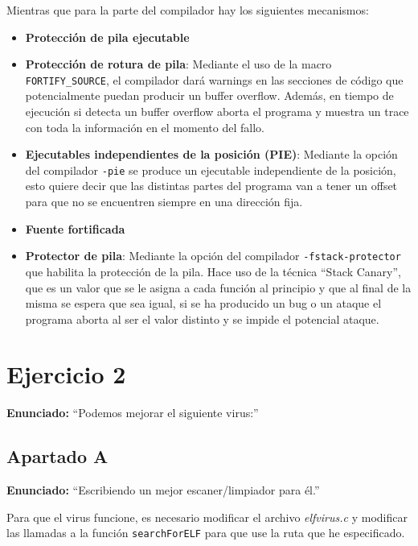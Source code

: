 \documentclass{article}
\begin{document}
\bigskip

Mientras que para la parte del compilador hay los siguientes mecanismos:

\begin{itemize}
    \item \textbf{Protección de pila ejecutable}
    \item \textbf{Protección de rotura de pila}: Mediante el uso de la macro \verb|FORTIFY_SOURCE|, el compilador dará warnings en las secciones de código que potencialmente puedan producir un buffer overflow. Además, en tiempo de ejecución si detecta un buffer overflow aborta el programa y muestra un trace con toda la información en el momento del fallo.
    \item \textbf{Ejecutables independientes de la posición (PIE)}: Mediante la opción del compilador \verb|-pie| se produce un ejecutable independiente de la posición, esto quiere decir que las distintas partes del programa van a tener un offset para que no se encuentren siempre en una dirección fija.
    \item \textbf{Fuente fortificada}
    \item \textbf{Protector de pila}: Mediante la opción del compilador \verb|-fstack-protector| que habilita la protección de la pila. Hace uso de la técnica ``Stack Canary'', que es un valor que se le asigna a cada función al principio y que al final de la misma se espera que sea igual, si se ha producido un bug o un ataque el programa aborta al ser el valor distinto y se impide el potencial ataque.
\end{itemize}

\newpage

\section{Ejercicio 2}

\textbf{Enunciado: }``Podemos mejorar el siguiente virus:''
\subsection{Apartado A}

\textbf{Enunciado: }``Escribiendo un mejor escaner/limpiador para él.''

\bigskip

Para que el virus funcione, es necesario modificar el archivo \textit{elfvirus.c} y modificar las llamadas a la función \verb|searchForELF| para que use la ruta que he especificado.
\end{document}
